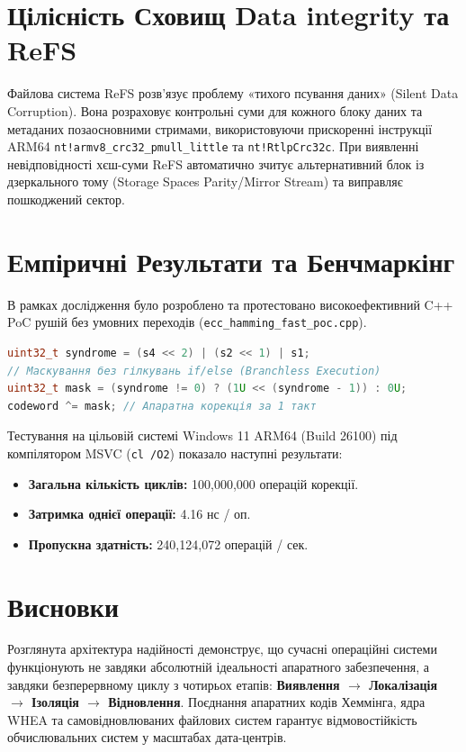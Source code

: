 \documentclass[12pt,a4paper]{article}
\begin{document}
\section{Цілісність Сховищ Data integrity та ReFS}
Файлова система ReFS розв'язує проблему «тихого псування даних» (Silent Data Corruption). Вона розраховує контрольні суми для кожного блоку даних та метаданих позаосновними стримами, використовуючи прискоренні інструкції ARM64 \texttt{nt!armv8\_crc32\_pmull\_little} та \texttt{nt!RtlpCrc32c}. При виявленні невідповідності хєш-суми ReFS автоматично зчитує альтернативний блок із дзеркального тому (Storage Spaces Parity/Mirror Stream) та виправляє пошкоджений сектор.

\section{Емпіричні Результати та Бенчмаркінг}
В рамках дослідження було розроблено та протестовано високоефективний C++ PoC рушій без умовних переходів (\texttt{ecc\_hamming\_fast\_poc.cpp}).

\begin{lstlisting}[language=C++, caption=Branchless інверсія помилки без конпресійних затримок]
uint32_t syndrome = (s4 << 2) | (s2 << 1) | s1;
// Маскування без гілкувань if/else (Branchless Execution)
uint32_t mask = (syndrome != 0) ? (1U << (syndrome - 1)) : 0U;
codeword ^= mask; // Апаратна корекція за 1 такт
\end{lstlisting}

Тестування на цільовій системі Windows 11 ARM64 (Build 26100) під компілятором MSVC (\texttt{cl /O2}) показало наступні результати:

\begin{itemize}
    \item \textbf{Загальна кількість циклів:} 100,000,000 операцій корекції.
    \item \textbf{Затримка однієї операції:} 4.16 нс / оп.
    \item \textbf{Пропускна здатність:} 240,124,072 операцій / сек.
\end{itemize}

\section{Висновки}
Розглянута архітектура надійності демонструє, що сучасні операційні системи функціонують не завдяки абсолютній ідеальності апаратного забезпечення, а завдяки безперервному циклу з чотирьох етапів: \textbf{Виявлення $\rightarrow$ Локалізація $\rightarrow$ Ізоляція $\rightarrow$ Відновлення}. Поєднання апаратних кодів Хеммінга, ядра WHEA та самовідновлюваних файлових систем гарантує відмовостійкість обчислювальних систем у масштабах дата-центрів.
\end{document}
